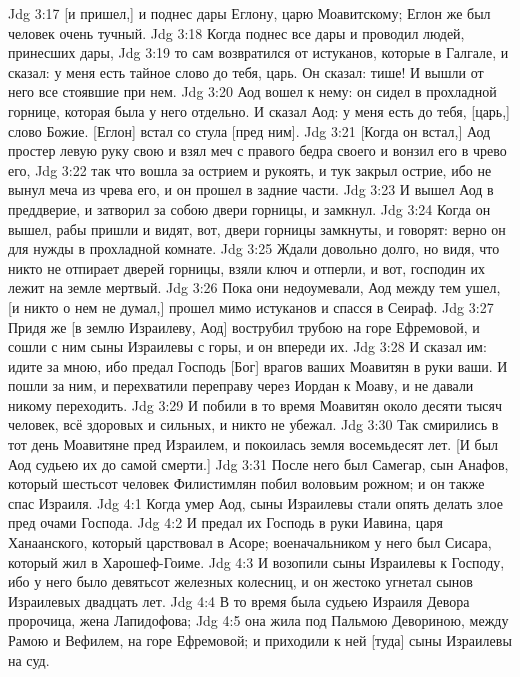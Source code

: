 \vs Jdg 3:17 [и пришел,] и поднес дары Еглону, царю Моавитскому; Еглон же был человек очень тучный.
\vs Jdg 3:18 Когда поднес  все дары и проводил людей, принесших дары,
\vs Jdg 3:19 то сам возвратился от истуканов, которые в Галгале, и сказал: у меня есть тайное слово до тебя, царь. Он сказал: тише! И вышли от него все стоявшие при нем.
\vs Jdg 3:20 Аод вошел к нему: он сидел в прохладной горнице, которая была у него отдельно. И сказал Аод: у меня есть до тебя, [царь,] слово Божие. [Еглон] встал со стула [пред ним].
\vs Jdg 3:21 [Когда он встал,] Аод простер левую руку свою и взял меч с правого бедра своего и вонзил его в чрево его,
\vs Jdg 3:22 так что вошла за острием и рукоять, и тук закрыл острие, ибо  не вынул меча из чрева его, и он прошел в задние части.
\vs Jdg 3:23 И вышел Аод в преддверие, и затворил за собою двери горницы, и замкнул.
\vs Jdg 3:24 Когда он вышел, рабы  пришли и видят, вот, двери горницы замкнуты, и говорят: верно он для нужды в прохладной комнате.
\vs Jdg 3:25 Ждали довольно долго, но видя, что никто не отпирает дверей горницы, взяли ключ и отперли, и вот, господин их лежит на земле мертвый.
\vs Jdg 3:26 Пока они недоумевали, Аод между тем ушел, [и никто о нем не думал,] прошел мимо истуканов и спасся в Сеираф.
\vs Jdg 3:27 Придя же [в землю Израилеву, Аод] вострубил трубою на горе Ефремовой, и сошли с ним сыны Израилевы с горы, и он  впереди их.
\vs Jdg 3:28 И сказал им: идите за мною, ибо предал Господь [Бог] врагов ваших Моавитян в руки ваши. И пошли за ним, и перехватили переправу через Иордан к Моаву, и не давали никому переходить.
\vs Jdg 3:29 И побили в то время Моавитян около десяти тысяч человек, всё здоровых и сильных, и никто не убежал.
\vs Jdg 3:30 Так смирились в тот день Моавитяне пред Израилем, и покоилась земля восемьдесят лет. [И был Аод судьею их до самой смерти.]
\vs Jdg 3:31 После него был Самегар, сын Анафов, который шестьсот человек Филистимлян побил воловьим рожном; и он также спас Израиля.
\vs Jdg 4:1 Когда умер Аод, сыны Израилевы стали опять делать злое пред очами Господа.
\vs Jdg 4:2 И предал их Господь в руки Иавина, царя Ханаанского, который царствовал в Асоре; военачальником у него был Сисара, который жил в Харошеф-Гоиме.
\vs Jdg 4:3 И возопили сыны Израилевы к Господу, ибо у него было девятьсот железных колесниц, и он жестоко угнетал сынов Израилевых двадцать лет.
\rsbpar\vs Jdg 4:4 В то время была судьею Израиля Девора пророчица, жена Лапидофова;
\vs Jdg 4:5 она жила под Пальмою Девориною, между Рамою и Вефилем, на горе Ефремовой; и приходили к ней [туда] сыны Израилевы на суд.
